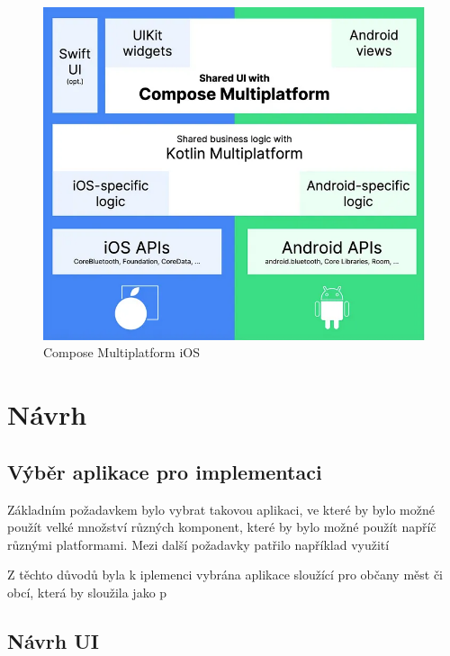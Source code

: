 \begin{figure}[H]
    \centering
    \includegraphics[width=.7\textwidth]{composeIOS.png}
    \caption{Compose Multiplatform iOS}
    \label{fig:composeIOS}
\end{figure}

\chapter{Návrh}



\section{Výběr aplikace pro implementaci}
Základním požadavkem bylo vybrat takovou aplikaci, ve které by bylo možné použít velké množství různých komponent, které by bylo možné použít napříč různými platformami.
Mezi další požadavky patřilo například využití  

Z těchto důvodů byla k iplemenci vybrána aplikace sloužící pro občany měst či obcí, která by sloužila jako p



\section{Návrh UI}

